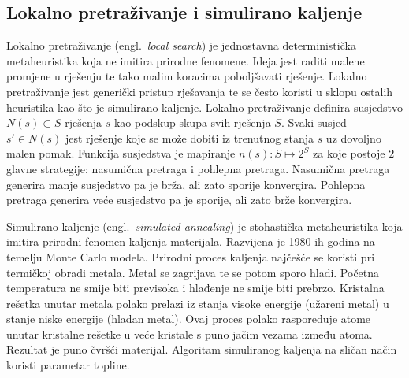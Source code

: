 \documentclass[times, utf8, diplomski]{fer}
\begin{document}
\subsection{Lokalno pretraživanje i simulirano kaljenje}

Lokalno pretraživanje (engl.~\textit{local search}) je jednostavna deterministička metaheuristika koja ne imitira prirodne fenomene. Ideja jest raditi malene promjene u rješenju te tako malim koracima poboljšavati rješenje. Lokalno pretraživanje jest generički pristup rješavanja te se često koristi u sklopu ostalih heuristika kao što je simulirano kaljenje. Lokalno pretraživanje definira susjedstvo $N(s) \subset S$ rješenja $s$ kao podskup skupa svih rješenja $S$. Svaki susjed $s' \in N(s)$ jest rješenje koje se može dobiti iz trenutnog stanja $s$ uz dovoljno malen pomak. Funkcija susjedstva je mapiranje $n(s): S \mapsto 2^{S}$ za koje postoje $2$ glavne strategije: nasumična pretraga i pohlepna pretraga. Nasumična pretraga generira manje susjedstvo pa je brža, ali zato sporije konvergira. Pohlepna pretraga generira veće susjedstvo pa je sporije, ali zato brže konvergira.

Simulirano kaljenje (engl.~\textit{simulated annealing}) je stohastička metaheuristika koja imitira prirodni fenomen kaljenja materijala. Razvijena je 1980-ih godina na temelju Monte Carlo modela. Prirodni proces kaljenja najčešće se koristi pri termičkoj obradi metala. Metal se zagrijava te se potom sporo hladi. Početna temperatura ne smije biti previsoka i hlađenje ne smije biti prebrzo. Kristalna rešetka unutar metala polako prelazi iz stanja visoke energije (užareni metal) u stanje niske energije (hladan metal). Ovaj proces polako raspoređuje atome unutar kristalne rešetke u veće kristale s puno jačim vezama između atoma. Rezultat je puno čvršći materijal. Algoritam simuliranog kaljenja na sličan način koristi parametar topline.
\end{document}
